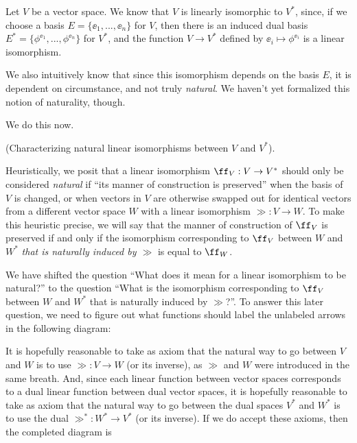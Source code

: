 Let $V$ be a vector space. We know that $V$ is linearly isomorphic to $V^*$, since, if we choose a basis $E = \{\ee_1, ..., \ee_n\}$ for $V$, then there is an induced dual basis $E^* = \{\phi^{\ee_1}, ..., \phi^{\ee_n}\}$ for $V^*$, and the function $V \rightarrow V^*$ defined by $\ee_i \mapsto \phi^{\ee_i}$ is a linear isomorphism.

We also intuitively know that since this isomorphism depends on the basis $E$, it is dependent on circumstance, and not truly \textit{natural}. We haven't yet formalized this notion of naturality, though.

We do this now.

\begin{deriv}
	(Characterizing natural linear isomorphisms between $V$ and $V^*$).
	
	Heuristically, we posit that a linear isomorphism $\ff_V:V \rightarrow V^*$ should only be considered \textit{natural} if ``its manner of construction is preserved'' when the basis of $V$ is changed, or when vectors in $V$ are otherwise swapped out for identical vectors from a different vector space $W$ with a linear isomorphism $\gg:V \rightarrow W$. To make this heuristic precise, we will say that the manner of construction of $\ff_V$ is preserved if and only if the isomorphism corresponding to $\ff_V$ between $W$ and $W^*$ \textit{that is naturally induced by $\gg$} is equal to $\ff_W$.
	
	We have shifted the question ``What does it mean for a linear isomorphism to be natural?'' to the question ``What is the isomorphism corresponding to $\ff_V$ between $W$ and $W^*$ that is naturally induced by $\gg$?''. To answer this later question, we need to figure out what functions should label the unlabeled arrows in the following diagram:
	
	\begin{center}
	\end{center}
	
	It is hopefully reasonable to take as axiom that the natural way to go between $V$ and $W$ is to use $\gg:V \rightarrow W$ (or its inverse), as $\gg$ and $W$ were introduced in the same breath. And, since each linear function between vector spaces corresponds to a dual linear function between dual vector spaces, it is hopefully reasonable to take as axiom that the natural way to go between the dual spaces $V^*$ and $W^*$ is to use the dual $\gg^*:W^* \rightarrow V^*$ (or its inverse). If we do accept these axioms, then the completed diagram is
	

\end{deriv}
